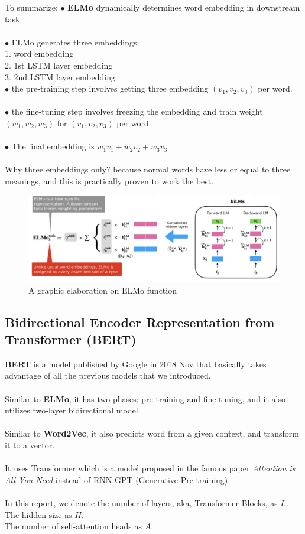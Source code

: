 \documentclass[paper=a4, fontsize=12pt]{scrartcl}
\begin{document}
To summarize:
$\bullet$ \textbf{ELMo} dynamically determines word embedding in downstream task \\\\
$\bullet$ ELMo generates three embeddings: \\
1. word embedding \\
2. 1st LSTM layer embedding \\
3. 2nd LSTM layer embedding \\
$\bullet$ the pre-training step involves getting three embedding $(v_1, v_2, v_3)$ per word. \\\\
$\bullet$ the fine-tuning step involves freezing the embedding and train weight $(w_1, w_2, w_3)$ for $(v_1, v_2, v_3)$ per word. \\\\
$\bullet$ The final embedding is $w_1 v_1 + w_2 v_2 + w_3 v_3$\\\\
Why three embeddings only? because normal words have less or equal to three meanings, and this is practically proven to work the best. 
 \begin{figure}
  \includegraphics[scale=0.7]{elmofunction.png}
  \caption{A graphic elaboration on ELMo function}
  \label{fig:skip-gram}
\end{figure}
\subsection{Bidirectional Encoder Representation from Transformer (BERT)}
\textbf{BERT} is a model published by Google in 2018 Nov that basically takes advantage of all the previous models that we introduced. \\\\
Similar to \textbf{ELMo}, it has two phases: pre-training and fine-tuning, and it also utilizes two-layer bidirectional model. \\\\
Similar to \textbf{Word2Vec}, it also predicts word from a given context, and transform it to a vector.\\\\
It uses Transformer which is a model proposed in the famous paper \textit{Attention is All You Need} instead of RNN-GPT (Generative Pre-training).\\\\
In this report, we denote the number of layers, aka, Transformer Blocks, as $L$.\\
The hidden size as $H$. \\
The number of self-attention heads as $A$. 
\end{document}
